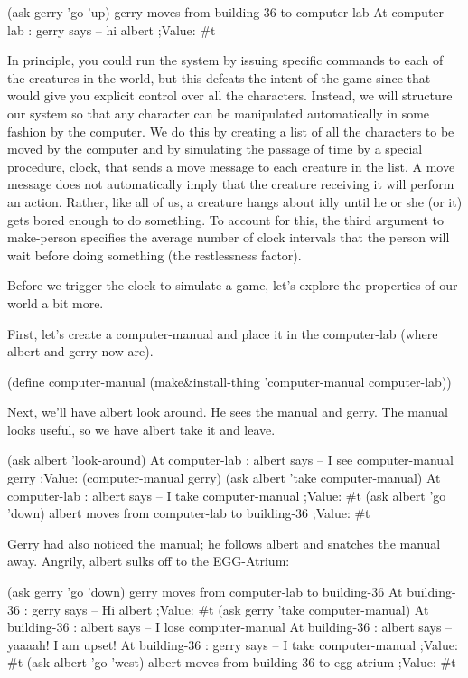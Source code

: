 \beginlisp
(ask gerry 'go 'up)
gerry moves from building-36 to computer-lab
At computer-lab : gerry says -- hi albert
;Value: \#t
\endlisp

In principle, you could run the system by issuing specific commands to
each of the creatures in the world, but this defeats the intent of the
game since that would give you explicit control over all the
characters.  Instead, we will structure our system so that any
character can be manipulated automatically in some fashion by the
computer.  We do this by creating a list of all the characters to be
moved by the computer and by simulating the passage of time by a
special procedure, {\cf clock}, that sends a {\cf move} message to
each creature in the list.  A {\cf move} message does not
automatically imply that the creature receiving it will perform an
action.  Rather, like all of us, a creature hangs about idly until he
or she (or it) gets bored enough to do something.  To account for
this, the third argument to {\cf make-person} specifies the average number of
clock intervals that the person will wait before doing something (the
restlessness factor).

Before we trigger the clock to simulate a game, let's explore the
properties of our world a bit more.

First, let's create a {\cf computer-manual} and place it in the {\cf
computer-lab} (where {\cf albert} and {\cf gerry} now are).

\beginlisp
(define computer-manual (make\&install-thing 'computer-manual computer-lab))
\endlisp

Next, we'll have {\cf albert} look around.  He sees the manual and {\cf
gerry}.  The manual looks useful, so we have {\cf albert} take it and leave.

\beginlisp
(ask albert 'look-around)
At computer-lab : albert says -- I see computer-manual gerry
;Value: (computer-manual gerry)
\null
(ask albert 'take computer-manual)
At computer-lab : albert says -- I take computer-manual
;Value: \#t
\null
(ask albert 'go 'down)
albert moves from computer-lab to building-36
;Value: \#t
\endlisp

{\cf Gerry} had also noticed the manual; he follows {\cf albert} and
snatches the manual away.  Angrily, {\cf albert} sulks off to the
EGG-Atrium:

\beginlisp
(ask gerry 'go 'down)
gerry moves from computer-lab to building-36
At building-36 : gerry says -- Hi albert
;Value: \#t
\null
(ask gerry 'take computer-manual)
At building-36 : albert says -- I lose computer-manual
At building-36 : albert says -- yaaaah! I am upset!
At building-36 : gerry says -- I take computer-manual
;Value: \#t
\null
(ask albert 'go 'west)
albert moves from building-36 to egg-atrium
;Value: \#t
\endlisp


